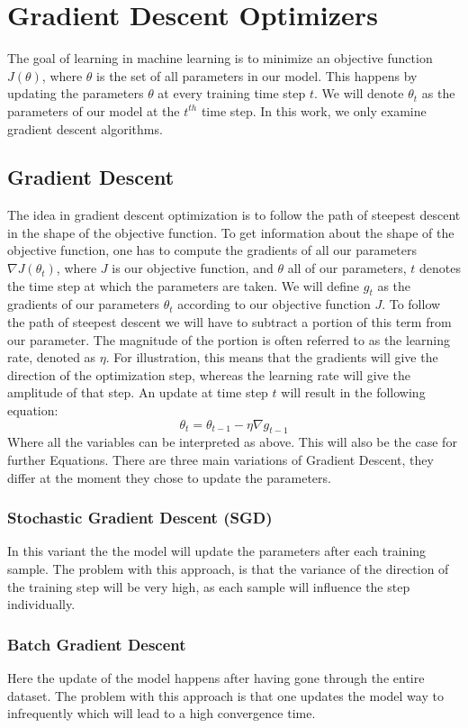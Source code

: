 \section{Gradient Descent Optimizers} \label{optimizers}
The goal of learning in machine learning is to minimize an objective function  $J(\theta)$, where $\theta$ is the set of all parameters in our model. This happens by updating the parameters $\theta$ at every training time step $t$. We will denote $\theta_{t}$ as the parameters of our model at the $t^{th}$ time step. In this work, we only examine gradient descent algorithms.
\subsection{Gradient Descent}
The idea in gradient descent optimization is to follow the path of steepest descent in the shape of the objective function. To get information about the shape of the objective function, one has to compute the gradients of all our parameters   $\nabla J(\theta_{t})$, where $J$ is our objective function, and $\theta$ all of our parameters, $t$ denotes the time step at which the parameters are taken. We will define $g_{t}$ as the gradients of our parameters $\theta_t$ according to our objective function $J$. To follow the path of steepest descent we will have to subtract a portion of this term from our parameter. The magnitude of the portion is often referred to as the learning rate, denoted as $\eta$. For illustration, this means that the gradients will give the direction of the optimization step, whereas the learning rate will give the amplitude of that step. An update at time step $t$ will result in the following equation:
\begin{equation}
\theta_t = \theta_{t-1} - \eta \nabla g_{t-1}
\end{equation}
Where all the variables can be interpreted as above. This will also be the case for further Equations. 
There are three main variations of Gradient Descent, they differ at the moment they chose to update the parameters.
\subsubsection{Stochastic Gradient Descent (SGD)} 
In this variant the the model will update the parameters after each training sample. The problem with this approach, is that the variance of the direction of the training step will be very high, as each sample will influence the step individually.
\subsubsection{Batch Gradient Descent} 
Here the update of the model happens after having gone through the entire dataset. The problem with this approach is that one updates the model way to infrequently which will lead to a high convergence time.
